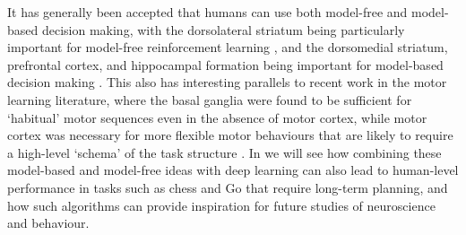 It has generally been accepted that humans can use both model-free and model-based decision making, with the dorsolateral striatum being particularly important for model-free reinforcement learning \citep{yin2004lesions, yin2005role}, and the dorsomedial striatum, prefrontal cortex, and hippocampal formation being important for model-based decision making \citep{vikbladh2019hippocampal,geerts2020general,miller2017dorsal,niv2009reinforcement,killcross2003coordination}.
This also has interesting parallels to recent work in the motor learning literature, where the basal ganglia were found to be sufficient for `habitual' motor sequences even in the absence of motor cortex, while motor cortex was necessary for more flexible motor behaviours that are likely to require a high-level `schema' of the task structure \citep{mizes2023motor,mizes2023dissociating}.
In  we will see how combining these model-based and model-free ideas with deep learning can also lead to human-level performance in tasks such as chess and Go that require long-term planning, and how such algorithms can provide inspiration for future studies of neuroscience and behaviour.
